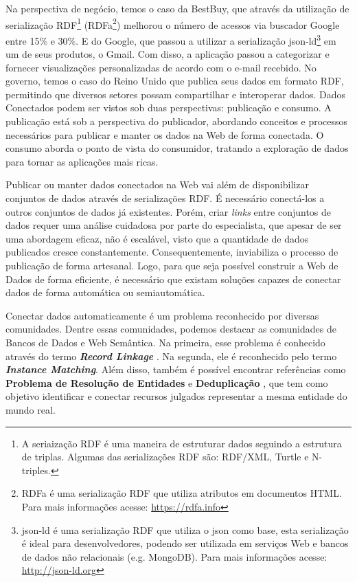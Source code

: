 Na perspectiva de negócio, temos o caso da BestBuy, que através da utilização de serialização RDF\footnote{A seriaização RDF é uma maneira de estruturar dados seguindo a estrutura de triplas. Algumas das serializações RDF são: RDF/XML, Turtle e N-triples. } (RDFa\footnote{RDFa é uma serialização RDF que utiliza atributos em documentos HTML. Para mais informações acesse: \url{https://rdfa.info}}) melhorou o número de acessos via buscador  Google entre 15\% e 30\%. E do Google, que passou a utilizar a serialização json-ld\footnote{json-ld é uma serialização RDF que utiliza o json como base, esta serialização é ideal para desenvolvedores, podendo ser utilizada em serviços Web e bancos de dados não relacionais (e.g. MongoDB). Para mais informações acesse: \url{http://json-ld.org}} em um de seus produtos, o Gmail. Com disso, a aplicação passou a categorizar e fornecer visualizações personalizadas de acordo com o e-mail recebido. No governo, temos o caso do Reino Unido que publica seus dados em formato RDF, permitindo que diversos setores possam compartilhar e interoperar dados.
Dados Conectados podem ser vistos sob duas perspectivas: publicação e consumo. A publicação está sob a perspectiva do publicador, abordando conceitos \cite{berners2006linked, wood2014linked} e processos \cite{bizer2007publish, hyland2011joy, villazon2011methodological, Avila2015} necessários para publicar e manter os dados na Web de forma conectada. O consumo aborda o ponto de vista do consumidor, tratando a exploração de dados para tornar as aplicações mais ricas. 

Publicar ou manter dados conectados na Web vai além de disponibilizar conjuntos de dados através de serializações RDF. É necessário conectá-los a outros conjuntos de dados já existentes. Porém, criar \textit{links} entre conjuntos de dados requer uma análise cuidadosa por parte do especialista, que apesar de ser uma abordagem eficaz, não é escalável, visto que a quantidade de dados publicados cresce constantemente. Consequentemente, inviabiliza o processo de publicação de forma artesanal. Logo, para que seja possível construir a Web de Dados de forma eficiente, é necessário que existam soluções capazes de conectar dados de forma automática ou semiautomática.

Conectar dados automaticamente é um problema reconhecido por diversas comunidades. Dentre essas comunidades, podemos destacar as comunidades de Bancos de Dados e Web Semântica. Na primeira, esse problema é conhecido através do termo \textbf{\textit{Record Linkage}} \cite{gu2003record}. Na segunda, ele é reconhecido pelo termo \textbf{\textit{Instance Matching}}. Além disso, também é possível encontrar referências como \textbf{Problema de Resolução de Entidades} \cite{menestrina2005generic} e \textbf{Deduplicação} \cite{sarawagi2002interactive}, que tem como objetivo identificar e conectar recursos julgados representar a mesma entidade do mundo real.

